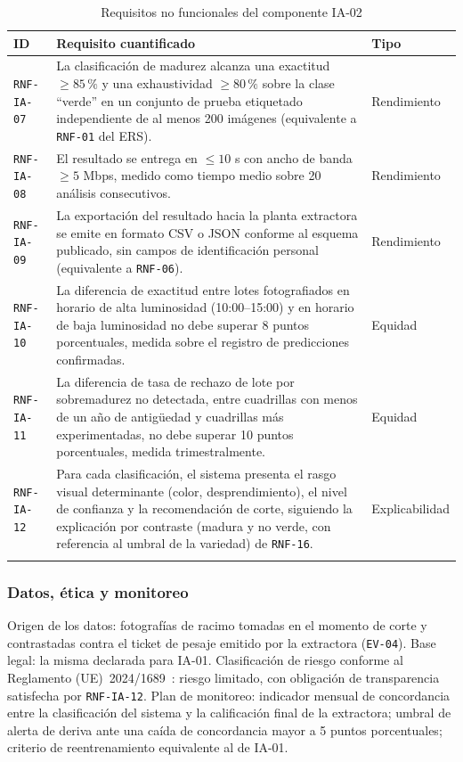 \documentclass[11pt,a4paper]{article}
\newcommand{\id}[1]{\texttt{#1}}
\begin{document}
\begin{longtable}{|L{1.9cm}|L{10.6cm}|L{2.0cm}|}
\hline
{}\textbf{ID} & \textbf{Requisito cuantificado} & \textbf{Tipo} \\ \hline
\endhead
\id{RNF-IA-07} & La clasificación de madurez alcanza una exactitud $\geq 85\,\%$ y una
exhaustividad $\geq 80\,\%$ sobre la clase ``verde'' en un conjunto de prueba etiquetado
independiente de al menos 200 imágenes (equivalente a \id{RNF-01} del ERS). & Rendimiento \\ \hline
\id{RNF-IA-08} & El resultado se entrega en $\leq 10$ s con ancho de banda $\geq 5$ Mbps, medido
como tiempo medio sobre 20 análisis consecutivos. & Rendimiento \\ \hline
\id{RNF-IA-09} & La exportación del resultado hacia la planta extractora se emite en formato CSV o
JSON conforme al esquema publicado, sin campos de identificación personal (equivalente a
\id{RNF-06}). & Rendimiento \\ \hline
{}
\id{RNF-IA-10} & La diferencia de exactitud entre lotes fotografiados en horario de alta
luminosidad (10:00--15:00) y en horario de baja luminosidad no debe superar 8 puntos porcentuales,
medida sobre el registro de predicciones confirmadas. & Equidad \\ \hline
{}
\id{RNF-IA-11} & La diferencia de tasa de rechazo de lote por sobremadurez no detectada, entre
cuadrillas con menos de un año de antigüedad y cuadrillas más experimentadas, no debe superar 10
puntos porcentuales, medida trimestralmente. & Equidad \\ \hline
\id{RNF-IA-12} & Para cada clasificación, el sistema presenta el rasgo visual determinante (color,
desprendimiento), el nivel de confianza y la recomendación de corte, siguiendo la explicación por
contraste (madura y no verde, con referencia al umbral de la variedad) de \id{RNF-16}. &
Explicabilidad \\ \hline
\caption{Requisitos no funcionales del componente IA-02}
\end{longtable}

\subsubsection{Datos, ética y monitoreo}

Origen de los datos: fotografías de racimo tomadas en el momento de corte y contrastadas contra el
ticket de pesaje emitido por la extractora (\id{EV-04}). Base legal: la misma declarada para
IA-01. Clasificación de riesgo conforme al Reglamento (UE)~2024/1689~\cite{euaiact2024}: riesgo
limitado, con obligación de transparencia satisfecha por \id{RNF-IA-12}. Plan de monitoreo:
indicador mensual de concordancia entre la clasificación del sistema y la calificación final de la
extractora; umbral de alerta de deriva ante una caída de concordancia mayor a 5 puntos
porcentuales; criterio de reentrenamiento equivalente al de IA-01.
\end{document}
